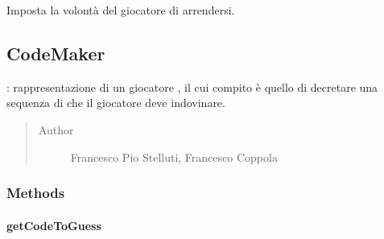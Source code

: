 \documentclass[letterpaper,10pt,italian,openany,oneside]{sphinxmanual}
\begin{document}
\begin{fulllineitems}
\label{\detokenize{source/it/unicam/cs/pa/mastermind/players/CodeBreaker:it.unicam.cs.pa.mastermind.players.CodeBreaker.toggleGiveUp()}}
Imposta la volontà del giocatore  di arrendersi.

\end{fulllineitems}



\subsection{CodeMaker}
\label{\detokenize{source/it/unicam/cs/pa/mastermind/players/CodeMaker:codemaker}}\label{\detokenize{source/it/unicam/cs/pa/mastermind/players/CodeMaker::doc}}

\begin{fulllineitems}
\label{\detokenize{source/it/unicam/cs/pa/mastermind/players/CodeMaker:it.unicam.cs.pa.mastermind.players.CodeMaker}}
: rappresentazione di un giocatore , il cui compito è quello di decretare una sequenza di  che il giocatore  deve indovinare.
\begin{quote}\begin{description}
\item[{Author}] \leavevmode
Francesco Pio Stelluti, Francesco Coppola

\end{description}\end{quote}

\end{fulllineitems}



\subsubsection{Methods}
\label{\detokenize{source/it/unicam/cs/pa/mastermind/players/CodeMaker:methods}}

\paragraph{getCodeToGuess}
\label{\detokenize{source/it/unicam/cs/pa/mastermind/players/CodeMaker:getcodetoguess}}
\end{document}
